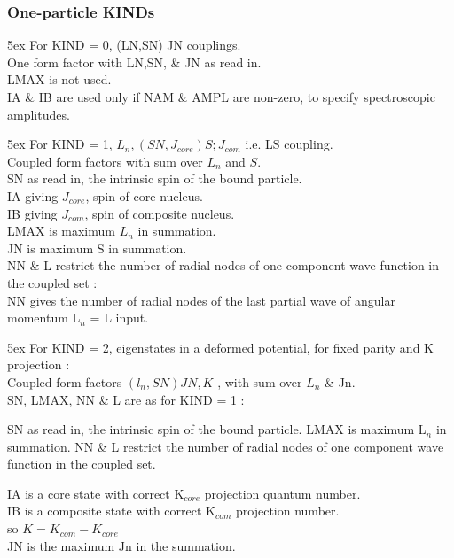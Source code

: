 \documentclass[11pt]{article}
\begin{document}
\subsubsection{One-particle KINDs}
\bigskip

\hangindent 5ex
For KIND = 0,   (LN,SN) JN couplings.
\\
One form factor with LN,SN, \& JN as read in.
\\
LMAX is not used.
\\
IA \& IB are used only if NAM \& AMPL are non-zero, to specify
spectroscopic amplitudes.
\bigskip

\hangindent 5ex
For KIND = 1,   $L_{n},(SN,J_{core})S; J_{com}$     i.e. LS coupling.
\\
Coupled form factors with sum over $L_{n}$ and $S$.
\\
SN as read in, the intrinsic spin of the bound particle.
\\
IA giving $J_{core}$, spin of core nucleus.
\\
IB giving $J_{com}$,  spin of composite nucleus.
\\
LMAX is maximum $L_{n}$ in summation.
\\
JN   is maximum S  in summation.
\\
NN \& L restrict the number of radial nodes of one component
wave function in the coupled set :
\\
NN gives the number of radial nodes of the last partial wave of
angular momentum L$_{n}$ = L input.
\bigskip

\hangindent 5ex
For KIND = 2,   eigenstates in a deformed potential, for fixed
parity and K projection :
\\
Coupled form factors  $(l_{n},SN) JN,K$ , with sum over $L_{n}$ \& Jn.
\\
SN, LMAX, NN \& L are as for KIND = 1 :

 SN as read in, the intrinsic spin of the bound particle.
 LMAX is maximum L$_{n}$ in summation.
 NN \& L restrict the number of radial nodes of one component
wave function in the coupled set.

IA is a core state with correct K$_{core}$ projection quantum number.
\\
IB is a composite state with correct K$_{com}$ projection number.
\\
    so $K = K_{com} - K_{core}$
\\
JN is the maximum Jn in the summation.
\bigskip
\end{document}
